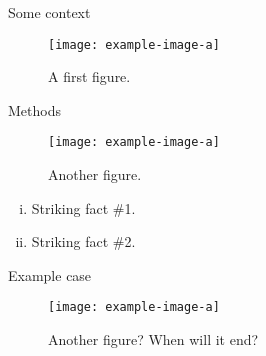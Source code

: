




\begin{frame}[t]
	\begin{columns}[t]
		\separatorcolumn
		\begin{column}{\colwidth}
			\begin{block}{Some context}
				\lipsum[1-2]
				\begin{figure}
					\centering
					\texttt{[image: example-image-a]}
					\caption{%
						A first figure.
					}
					\label{fig:compensation_scheme}
				\end{figure}
				\lipsum[3-4]
			\end{block}

			\begin{block}{Methods}
				\begin{figure}[hbtp]
					\texttt{[image: example-image-a]}
					\caption{%
						Another figure.
					}
					\label{fig:jaea_structure}
				\end{figure}
				\lipsum[5]
				\begin{enumerate}[(i)]
					\item Striking fact \#1.
					\item Striking fact \#2.
				\end{enumerate}
			\end{block}

			\begin{block}{Example case}
				\begin{figure}[hbtp]
					\texttt{[image: example-image-a]}
					\caption{Another figure? When will it end?}
					\label{fig:flowchart}
				\end{figure}
			\end{block}


\end{column}
\end{columns}
\end{frame}
